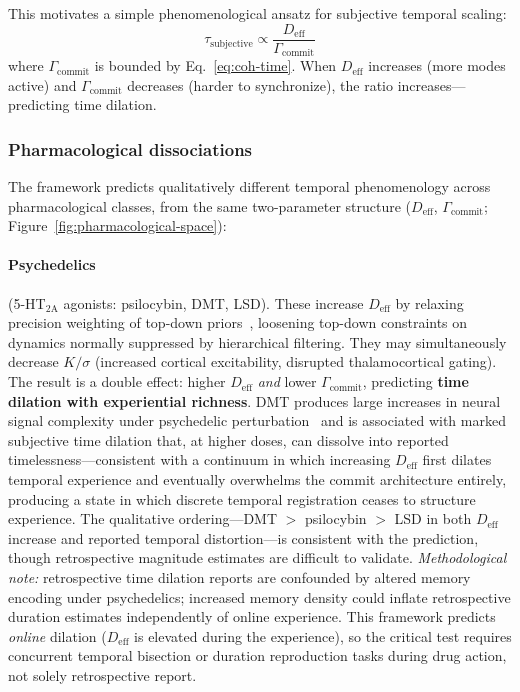\documentclass[12pt]{article}
\newcommand{\Deff}{D_{\mathrm{eff}}}
\begin{document}
This motivates a simple phenomenological ansatz for subjective temporal scaling:
\begin{equation}\label{eq:subjective-time}
\tau_{\mathrm{subjective}} \propto \frac{\Deff}{\Gamma_{\mathrm{commit}}}
\end{equation}
where $\Gamma_{\mathrm{commit}}$ is bounded by Eq.~\ref{eq:coh-time}. When $\Deff$
increases (more modes active) and $\Gamma_{\mathrm{commit}}$ decreases (harder to
synchronize), the ratio increases---predicting time dilation.

\subsubsection{Pharmacological dissociations}

The framework predicts qualitatively different temporal phenomenology across pharmacological
classes, from the same two-parameter structure ($\Deff$, $\Gamma_{\mathrm{commit}}$; Figure~\ref{fig:pharmacological-space}):

\paragraph{Psychedelics} (5-HT$_{2\mathrm{A}}$ agonists: psilocybin, DMT, LSD).
These increase $\Deff$ by relaxing precision weighting of top-down
priors~\cite{carhart2019rebus}, loosening top-down constraints on dynamics normally
suppressed by hierarchical filtering. They may simultaneously decrease $K/\sigma$ (increased cortical excitability,
disrupted thalamocortical gating). The result is a double effect: higher $\Deff$
\emph{and} lower $\Gamma_{\mathrm{commit}}$, predicting \textbf{time dilation with
experiential richness}. DMT produces large increases in neural signal
complexity under psychedelic perturbation~\cite{timmermann2019,schartner2017} and is associated with
marked subjective time dilation that, at higher doses, can dissolve into reported
timelessness---consistent with a continuum in which increasing $\Deff$ first dilates
temporal experience and eventually overwhelms the commit architecture entirely,
producing a state in which discrete temporal registration ceases to structure
experience. The qualitative ordering---DMT $>$ psilocybin $>$
LSD in both $\Deff$ increase and reported temporal distortion---is consistent with
the prediction, though retrospective magnitude estimates are difficult to validate. \emph{Methodological note:}
retrospective time dilation reports are confounded by altered memory encoding under
psychedelics; increased memory density could inflate retrospective duration estimates
independently of online experience. This framework predicts \emph{online} dilation
($\Deff$ is elevated during the experience), so the critical test requires concurrent
temporal bisection or duration reproduction tasks during drug action, not solely
retrospective report.
\end{document}
